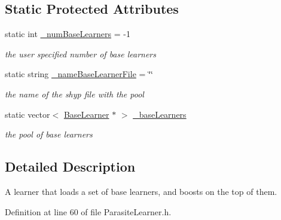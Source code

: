 \subsection*{Static Protected Attributes}
\begin{DoxyCompactItemize}
\item 
\hypertarget{classMultiBoost_1_1ParasiteLearner_aad6b4eead510608311bdf39d77b0cf35}{
static int \hyperlink{classMultiBoost_1_1ParasiteLearner_aad6b4eead510608311bdf39d77b0cf35}{\_\-numBaseLearners} = -\/1}
\label{classMultiBoost_1_1ParasiteLearner_aad6b4eead510608311bdf39d77b0cf35}

\begin{DoxyCompactList}\small\item\em the user specified number of base learners \end{DoxyCompactList}\item 
\hypertarget{classMultiBoost_1_1ParasiteLearner_af42cd23bfe5b0bd0108ffc2745a232df}{
static string \hyperlink{classMultiBoost_1_1ParasiteLearner_af42cd23bfe5b0bd0108ffc2745a232df}{\_\-nameBaseLearnerFile} = \char`\"{}\char`\"{}}
\label{classMultiBoost_1_1ParasiteLearner_af42cd23bfe5b0bd0108ffc2745a232df}

\begin{DoxyCompactList}\small\item\em the name of the shyp file with the pool \end{DoxyCompactList}\item 
\hypertarget{classMultiBoost_1_1ParasiteLearner_a0e6920e753c521e9b96535a42535c77e}{
static vector$<$ \hyperlink{classMultiBoost_1_1BaseLearner}{BaseLearner} $\ast$ $>$ \hyperlink{classMultiBoost_1_1ParasiteLearner_a0e6920e753c521e9b96535a42535c77e}{\_\-baseLearners}}
\label{classMultiBoost_1_1ParasiteLearner_a0e6920e753c521e9b96535a42535c77e}

\begin{DoxyCompactList}\small\item\em the pool of base learners \end{DoxyCompactList}\end{DoxyCompactItemize}


\subsection{Detailed Description}
A learner that loads a set of base learners, and boosts on the top of them. 

Definition at line 60 of file ParasiteLearner.h.



